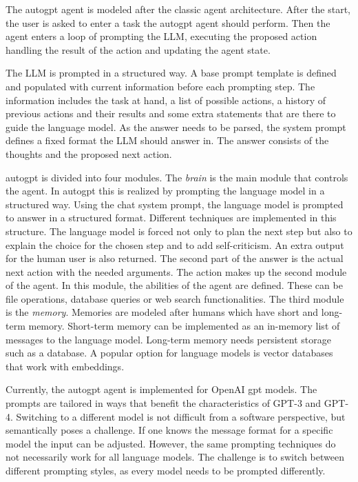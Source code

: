 \documentclass[../main.tex]{subfiles}
\begin{document}
The \gls{autogpt} agent is modeled after the classic agent architecture.
After the start,
the user is asked to enter a task the \gls{autogpt} agent should perform.
Then the agent enters a loop of prompting the LLM,
executing the proposed action
handling the result of the action and updating the agent state.

The LLM is prompted in a structured way.
A base prompt template is defined
and populated with current information before each prompting step.
The information includes the task at hand,
a list of possible actions,
a history of previous actions and their results
and some extra statements that are there to guide the language model.
As the answer needs to be parsed,
the system prompt defines a fixed format the LLM should answer in.
The answer consists of the thoughts and the proposed next action.

\gls{autogpt} is divided into four modules.
The \emph{brain} is the main module that controls the agent.
In \gls{autogpt} this is realized by prompting the language model in a structured way.
Using the chat system prompt,
the language model is prompted to answer in a structured format.
Different techniques are implemented in this structure.
The language model is forced not only to plan the next step
but also to explain the choice for the chosen step and to add self-criticism.
An extra output for the human user is also returned.
The second part of the answer is the actual next action with the needed arguments.
The action makes up the second module of the agent.
In this module, the abilities of the agent are defined.
These can be file operations,
database queries or web search functionalities.
The third module is the \emph{memory}.
Memories are modeled after humans which have short and long-term memory.
Short-term memory can be implemented
as an in-memory list of messages to the language model.
Long-term memory needs persistent storage such as a database.
A popular option for language models is vector databases that work with embeddings.

Currently,
the \gls{autogpt} agent is implemented for OpenAI \gls{gpt} models.
The prompts are tailored in ways
that benefit the characteristics of GPT-3 and GPT-4.
Switching to a different model is not difficult from a software perspective,
but semantically poses a challenge.
If one knows the message format for a specific model the input can be adjusted.
However, the same prompting techniques do not necessarily work for all language models.
The challenge is to switch between different prompting styles,
as every model needs to be prompted differently.
\end{document}
